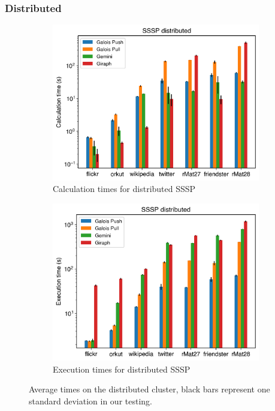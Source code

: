 \subsubsection{Distributed}
\begin{figure}[t!]
	\begin{subfigure}{\columnwidth}
		\includegraphics[width=\linewidth]{../../plots/distributedSSSP_calcTime.png}
		\caption{Calculation times for distributed SSSP}
		\label{fig:distributedSSSP_calc}
	\end{subfigure}
	\hfil
	\begin{subfigure}{\columnwidth}
		\includegraphics[width=\linewidth]{../../plots/distributedSSSP_execTime.png}
		\caption{Execution times for distributed SSSP}
		\label{fig:distributedSSSP_exec}
	\end{subfigure}
	\caption{Average times on the distributed cluster, black bars represent one standard deviation in our testing.}
	\label{fig:distributedSSSP}
\end{figure}

